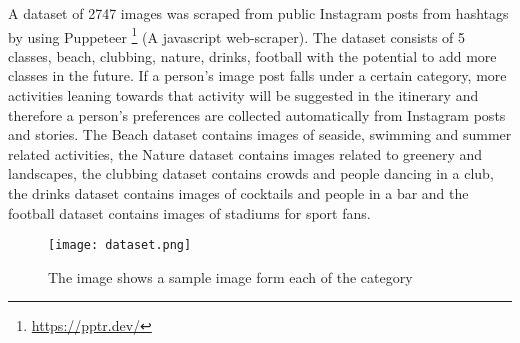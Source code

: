 A dataset of 2747 images was scraped from public Instagram posts from
hashtags by using Puppeteer \footnote{\url{https://pptr.dev/}} (A javascript web-scraper). The dataset
consists of 5 classes, beach, clubbing, nature, drinks, football with
the potential to add more classes in the future. If a person’s image
post falls under a certain category, more activities leaning towards
that activity will be suggested in the itinerary and therefore a
person’s preferences are collected automatically from Instagram posts
and stories. The Beach dataset contains images of seaside, swimming
and summer related activities, the Nature dataset contains images
related to greenery and landscapes, the clubbing dataset contains
crowds and people dancing in a club, the drinks dataset contains
images of cocktails and people in a bar and the football dataset
contains images of stadiums for sport fans. 

    \begin{figure}[H]
        \caption{The image shows a sample image form each of the category}
        \centering
        \texttt{[image: dataset.png]}
        \label{dataset}
    \end{figure}
